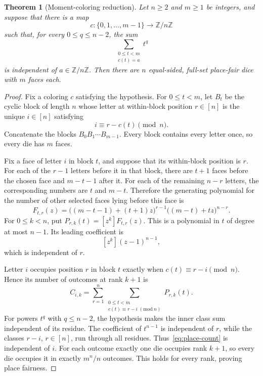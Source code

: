 \documentclass[11pt]{article}
\newtheorem{theorem}{Theorem}[section]
\theoremstyle{definition}
\theoremstyle{remark}
\begin{document}
\begin{theorem}[Moment-coloring reduction]\label{thm:place-moment}
Let \(n\geq2\) and \(m\geq1\) be integers, and suppose that there is a map
\[
  c:\{0,1,\ldots,m-1\}\longrightarrow\mathbb Z/n\mathbb Z
\]
such that, for every \(0\leq q\leq n-2\), the sum
\[
  \sum_{\substack{0\leq t<m\\c(t)=a}}t^q
\]
is independent of \(a\in\mathbb Z/n\mathbb Z\).  Then there are \(n\)
equal-sided, full-set place-fair dice with \(m\) faces each.
\end{theorem}

\begin{proof}
Fix a coloring \(c\) satisfying the hypothesis.  For \(0\leq t<m\), let \(B_t\) be
the cyclic block of length \(n\) whose letter at within-block position
\(r\in[n]\) is the unique \(i\in[n]\) satisfying
\[
  i\equiv r-c(t)\pmod n.
\]
Concatenate the blocks \(B_0B_1\cdots B_{m-1}\).  Every block contains every
letter once, so every die has \(m\) faces.

Fix a face of letter \(i\) in block \(t\), and suppose that its within-block
position is \(r\).  For each of the \(r-1\) letters before it in that block,
there are \(t+1\) faces before the chosen face and \(m-t-1\) after it.  For
each of the remaining \(n-r\) letters, the corresponding numbers are \(t\)
and \(m-t\).  Therefore the generating polynomial for the number of other
selected faces lying before this face is
\begin{equation}\label{eq:place-generating}
  F_{t,r}(z)=
  \bigl((m-t-1)+(t+1)z\bigr)^{r-1}
  \bigl((m-t)+tz\bigr)^{n-r}.
\end{equation}
For \(0\leq k<n\), put \(P_{r,k}(t)=[z^k]F_{t,r}(z)\).  This is a polynomial
in \(t\) of degree at most \(n-1\).  Its leading coefficient is
\[
  [z^k](z-1)^{n-1},
\]
which is independent of \(r\).

Letter \(i\) occupies position \(r\) in block \(t\) exactly when
\(c(t)\equiv r-i\pmod n\).  Hence its number of outcomes at rank \(k+1\) is
\begin{equation}\label{eq:place-count}
  C_{i,k}=\sum_{r=1}^n
     \sum_{\substack{0\leq t<m\\c(t)\equiv r-i\; (\mathrm{mod}\ n)}}
     P_{r,k}(t).
\end{equation}
For powers \(t^q\) with \(q\leq n-2\), the hypothesis makes the inner class
sum independent of its residue.  The coefficient of
\(t^{n-1}\) is independent of \(r\), while the classes
\(r-i\), \(r\in[n]\), run through all residues.  Thus~\eqref{eq:place-count}
is independent of \(i\).  For each outcome exactly one die occupies rank
\(k+1\), so every die occupies it in exactly \(m^n/n\) outcomes.  This holds
for every rank, proving place fairness.
\end{proof}
\end{document}

